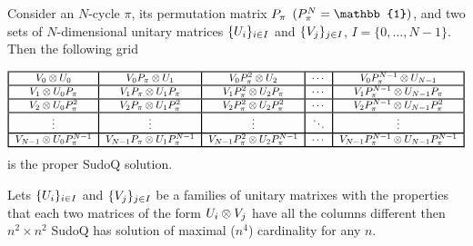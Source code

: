 \documentclass[11pt]{article}
\begin{document}
 \begin{lemma}\label{biglemma}
    Consider an $N$-cycle $\pi$, its permutation matrix $\mathnormal{P}_\pi$ $(\mathnormal{P}_\pi^N=\mathbb{1})$, and two sets of $N$-dimensional unitary matrices $\{\mathnormal{U}_i\}_{i\in I}$ and $\{\mathnormal{V}_j\}_{j\in I}$, $I=\{0,\ldots,N-1\}$. Then the following grid
    
    \[
    \begin{tabular}{!{\vrule width 1pt}c!{\vrule width 1pt}c!{\vrule width 1pt}c!{\vrule width 1pt}c!{\vrule width 1pt}c!{\vrule width 1pt}}
    \noalign{\hrule height 1pt}
    $\mathnormal{V}_0\otimes\mathnormal{U}_0$ & $\mathnormal{V}_0\mathnormal{P}_\pi\otimes\mathnormal{U}_1$ & $\mathnormal{V}_0\mathnormal{P}_\pi^2\otimes\mathnormal{U}_2$ & $\cdots$ & $\mathnormal{V}_0\mathnormal{P}_\pi^{N-1}\otimes\mathnormal{U}_{N-1}$ \tabularnewline
    \noalign{\hrule height 1pt}
    $\mathnormal{V}_1\otimes\mathnormal{U}_0\mathnormal{P}_\pi$ & $\mathnormal{V}_1\mathnormal{P}_\pi\otimes\mathnormal{U}_1\mathnormal{P}_\pi$ & $\mathnormal{V}_1\mathnormal{P}_\pi^2\otimes\mathnormal{U}_2\mathnormal{P}_\pi$ & $\cdots$ & $\mathnormal{V}_1\mathnormal{P}_\pi^{N-1}\otimes\mathnormal{U}_{N-1}\mathnormal{P}_\pi$ \tabularnewline
    \noalign{\hrule height 1pt}
    $\mathnormal{V}_2\otimes\mathnormal{U}_0\mathnormal{P}_\pi^2$ & $\mathnormal{V}_2\mathnormal{P}_\pi\otimes\mathnormal{U}_1\mathnormal{P}_\pi^2$ & $\mathnormal{V}_2\mathnormal{P}_\pi^2\otimes\mathnormal{U}_2\mathnormal{P}_\pi^2$ & $\cdots$ & $\mathnormal{V}_2\mathnormal{P}_\pi^{N-1}\otimes\mathnormal{U}_{N-1}\mathnormal{P}_\pi^2$ \tabularnewline
    \noalign{\hrule height 1pt}
    $\vdots$ & $\vdots$ & $\vdots$ & $\ddots$ & $\vdots$ \tabularnewline
    \noalign{\hrule height 1pt}
    $\mathnormal{V}_{N-1}\otimes\mathnormal{U}_0\mathnormal{P}_\pi^{N-1}$ & $\mathnormal{V}_{N-1}\mathnormal{P}_\pi\otimes\mathnormal{U}_1\mathnormal{P}_\pi^{N-1}$ & $\mathnormal{V}_{N-1}\mathnormal{P}_\pi^2\otimes\mathnormal{U}_2\mathnormal{P}_\pi^{N-1}$ & $\cdots$ & $\mathnormal{V}_{N-1}\mathnormal{P}_\pi^{N-1}\otimes\mathnormal{U}_{N-1}\mathnormal{P}_\pi^{N-1}$ \tabularnewline
    \noalign{\hrule height 1pt}
    \end{tabular}
    \]
    is the proper SudoQ solution.
    \end{lemma}

\begin{theorem}
    Lets  $\{\mathnormal{U}_i\}_{i\in I}$ and  $\{\mathnormal{V}_j\}_{j\in I}$ be a families of unitary matrixes with the properties that each two matrices of the form  $\mathnormal{U}_i\otimes\mathnormal{V}_j$ have all the columns different then $n^2\times n^2$ SudoQ has solution of maximal ($n^4$) cardinality for any $n$. 
\end{theorem}
\end{document}

